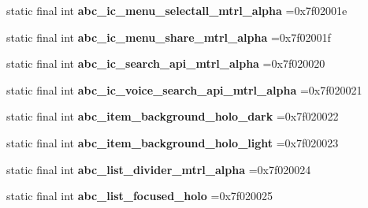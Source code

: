 \begin{DoxyCompactItemize}
\item 
\hypertarget{classcheck_1_1test_1_1_r_1_1drawable_afa8af898db443a4f0311bc0538ab0a40}{}static final int {\bfseries abc\+\_\+ic\+\_\+menu\+\_\+selectall\+\_\+mtrl\+\_\+alpha} =0x7f02001e\label{classcheck_1_1test_1_1_r_1_1drawable_afa8af898db443a4f0311bc0538ab0a40}

\item 
\hypertarget{classcheck_1_1test_1_1_r_1_1drawable_aec4787a74c0fc9178a8d2686234d31e6}{}static final int {\bfseries abc\+\_\+ic\+\_\+menu\+\_\+share\+\_\+mtrl\+\_\+alpha} =0x7f02001f\label{classcheck_1_1test_1_1_r_1_1drawable_aec4787a74c0fc9178a8d2686234d31e6}

\item 
\hypertarget{classcheck_1_1test_1_1_r_1_1drawable_a953690e73da26c3e55adb1f86cac130a}{}static final int {\bfseries abc\+\_\+ic\+\_\+search\+\_\+api\+\_\+mtrl\+\_\+alpha} =0x7f020020\label{classcheck_1_1test_1_1_r_1_1drawable_a953690e73da26c3e55adb1f86cac130a}

\item 
\hypertarget{classcheck_1_1test_1_1_r_1_1drawable_a2ba50d738c68158a3eede321d8b360f6}{}static final int {\bfseries abc\+\_\+ic\+\_\+voice\+\_\+search\+\_\+api\+\_\+mtrl\+\_\+alpha} =0x7f020021\label{classcheck_1_1test_1_1_r_1_1drawable_a2ba50d738c68158a3eede321d8b360f6}

\item 
\hypertarget{classcheck_1_1test_1_1_r_1_1drawable_a155fd1534dd199825940fb36dde01964}{}static final int {\bfseries abc\+\_\+item\+\_\+background\+\_\+holo\+\_\+dark} =0x7f020022\label{classcheck_1_1test_1_1_r_1_1drawable_a155fd1534dd199825940fb36dde01964}

\item 
\hypertarget{classcheck_1_1test_1_1_r_1_1drawable_a4d865ba3aac7da4989764ab645066e00}{}static final int {\bfseries abc\+\_\+item\+\_\+background\+\_\+holo\+\_\+light} =0x7f020023\label{classcheck_1_1test_1_1_r_1_1drawable_a4d865ba3aac7da4989764ab645066e00}

\item 
\hypertarget{classcheck_1_1test_1_1_r_1_1drawable_ac2ba036175d0fa9de35425e265985dc3}{}static final int {\bfseries abc\+\_\+list\+\_\+divider\+\_\+mtrl\+\_\+alpha} =0x7f020024\label{classcheck_1_1test_1_1_r_1_1drawable_ac2ba036175d0fa9de35425e265985dc3}

\item 
\hypertarget{classcheck_1_1test_1_1_r_1_1drawable_ae0d6fb278a72918d06fd94dbc60c5a0a}{}static final int {\bfseries abc\+\_\+list\+\_\+focused\+\_\+holo} =0x7f020025\label{classcheck_1_1test_1_1_r_1_1drawable_ae0d6fb278a72918d06fd94dbc60c5a0a}


\end{DoxyCompactItemize}
